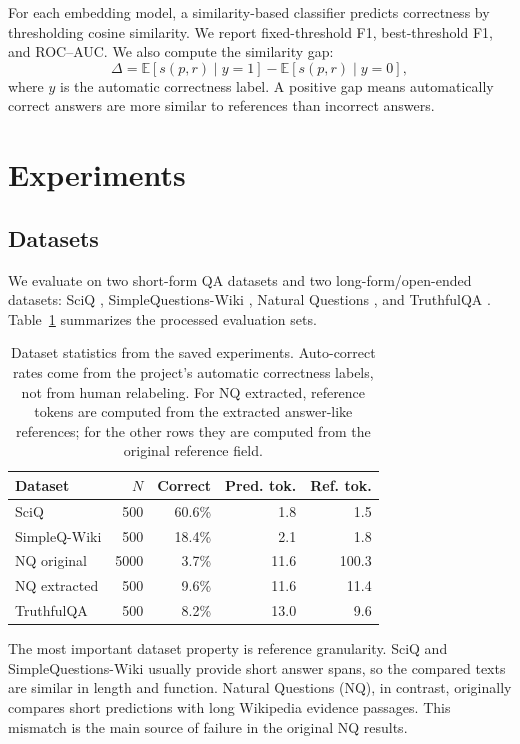 \documentclass[11pt]{article}
\begin{document}
For each embedding model, a similarity-based classifier predicts correctness by thresholding cosine similarity. We report fixed-threshold F1, best-threshold F1, and ROC--AUC. We also compute the similarity gap:
\begin{equation}
\Delta = \mathbb{E}[s(p,r) \mid y=1] -
\mathbb{E}[s(p,r) \mid y=0],
\end{equation}
where $y$ is the automatic correctness label. A positive gap means automatically correct answers are more similar to references than incorrect answers.

\section{Experiments}

\subsection{Datasets}

We evaluate on two short-form QA datasets and two long-form/open-ended datasets: SciQ \citep{welbl-etal-2017-sciq}, SimpleQuestions-Wiki \citep{bordes-etal-2015-simplequestions}, Natural Questions \citep{kwiatkowski-etal-2019-natural}, and TruthfulQA \citep{lin-etal-2022-truthfulqa}. Table~\ref{tab:datasets} summarizes the processed evaluation sets.

\begin{table}[t]
\centering
\small
\begin{tabular}{lrrrr}
\toprule
Dataset & $N$ & Correct & Pred. tok. & Ref. tok. \\
\midrule
SciQ & 500 & 60.6\% & 1.8 & 1.5 \\
SimpleQ-Wiki & 500 & 18.4\% & 2.1 & 1.8 \\
NQ original & 5000 & 3.7\% & 11.6 & 100.3 \\
NQ extracted & 500 & 9.6\% & 11.6 & 11.4 \\
TruthfulQA & 500 & 8.2\% & 13.0 & 9.6 \\
\bottomrule
\end{tabular}
\caption{Dataset statistics from the saved experiments. Auto-correct rates come from the project's automatic correctness labels, not from human relabeling. For NQ extracted, reference tokens are computed from the extracted answer-like references; for the other rows they are computed from the original reference field.}
\label{tab:datasets}
\end{table}

The most important dataset property is reference granularity. SciQ and SimpleQuestions-Wiki usually provide short answer spans, so the compared texts are similar in length and function. Natural Questions (NQ), in contrast, originally compares short predictions with long Wikipedia evidence passages. This mismatch is the main source of failure in the original NQ results.
\end{document}
